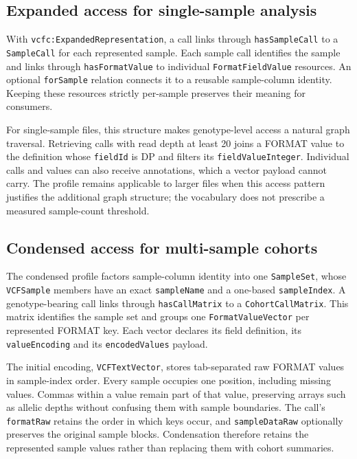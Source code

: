 \documentclass{ceurart}
\newcommand{\term}[1]{\texttt{#1}}
\begin{document}
\subsection{Expanded access for single-sample analysis}

With \term{vcfc:ExpandedRepresentation}, a call links through \term{hasSampleCall} to a \term{SampleCall} for each represented sample. Each sample call identifies the sample and links through \term{hasFormatValue} to individual \term{FormatFieldValue} resources. An optional \term{forSample} relation connects it to a reusable sample-column identity. Keeping these resources strictly per-sample preserves their meaning for consumers.

For single-sample files, this structure makes genotype-level access a natural graph traversal. Retrieving calls with read depth at least 20 joins a FORMAT value to the definition whose \term{fieldId} is DP and filters its \term{fieldValueInteger}. Individual calls and values can also receive annotations, which a vector payload cannot carry. The profile remains applicable to larger files when this access pattern justifies the additional graph structure; the vocabulary does not prescribe a measured sample-count threshold.

\subsection{Condensed access for multi-sample cohorts}

The condensed profile factors sample-column identity into one \term{SampleSet}, whose \term{VCFSample} members have an exact \term{sampleName} and a one-based \term{sampleIndex}. A genotype-bearing call links through \term{hasCallMatrix} to a \term{CohortCallMatrix}. This matrix identifies the sample set and groups one \term{FormatValueVector} per represented FORMAT key. Each vector declares its field definition, its \term{valueEncoding} and its \term{encodedValues} payload.

The initial encoding, \term{VCFTextVector}, stores tab-separated raw FORMAT values in sample-index order. Every sample occupies one position, including missing values. Commas within a value remain part of that value, preserving arrays such as allelic depths without confusing them with sample boundaries. The call's \term{formatRaw} retains the order in which keys occur, and \term{sampleDataRaw} optionally preserves the original sample blocks. Condensation therefore retains the represented sample values rather than replacing them with cohort summaries.
\end{document}
